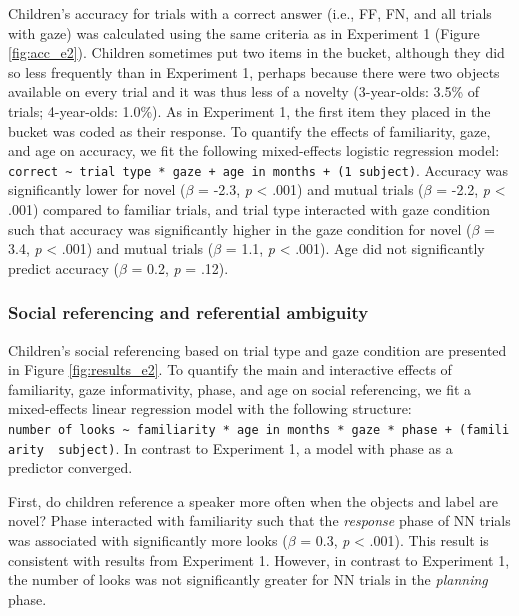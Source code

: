 \documentclass[a4paper,man,apacite,floatsintext]{apa6}
\begin{document}
Children's accuracy for trials with a correct answer (i.e., FF, FN, and
all trials with gaze) was calculated using the same criteria as in
Experiment 1 (Figure \ref{fig:acc_e2}). Children sometimes put two items
in the bucket, although they did so less frequently than in Experiment
1, perhaps because there were two objects available on every trial and
it was thus less of a novelty (3-year-olds: 3.5\% of trials;
4-year-olds: 1.0\%). As in Experiment 1, the first item they placed in
the bucket was coded as their response. To quantify the effects of
familiarity, gaze, and age on accuracy, we fit the following
mixed-effects logistic regression model:
\texttt{correct\ \textasciitilde{}\ trial\ type\ *\ gaze\ +\ age\ in\ months\ +\ (1\textbar{}\ subject)}.
Accuracy was significantly lower for novel (\(\beta\) = -2.3, \emph{p}
\textless{} .001) and mutual trials (\(\beta\) = -2.2, \emph{p}
\textless{} .001) compared to familiar trials, and trial type interacted
with gaze condition such that accuracy was significantly higher in the
gaze condition for novel (\(\beta\) = 3.4, \emph{p} \textless{} .001)
and mutual trials (\(\beta\) = 1.1, \emph{p} \textless{} .001). Age did
not significantly predict accuracy (\(\beta\) = 0.2, \emph{p} = .12).

\subsubsection{Social referencing and referential
ambiguity}\label{social-referencing-and-referential-ambiguity}

Children's social referencing based on trial type and gaze condition are
presented in Figure \ref{fig:results_e2}. To quantify the main and
interactive effects of familiarity, gaze informativity, phase, and age
on social referencing, we fit a mixed-effects linear regression model
with the following structure:
\texttt{number\ of\ looks\ \textasciitilde{}\ familiarity\ *\ age\ in\ months\ *\ gaze\ *\ phase\ +\ (familiarity\ \textbar{}\ subject)}.
In contrast to Experiment 1, a model with phase as a predictor
converged.

First, do children reference a speaker more often when the objects and
label are novel? Phase interacted with familiarity such that the
\emph{response} phase of NN trials was associated with significantly
more looks (\(\beta\) = 0.3, \emph{p} \textless{} .001). This result is
consistent with results from Experiment 1. However, in contrast to
Experiment 1, the number of looks was not significantly greater for NN
trials in the \emph{planning} phase.
\end{document}
